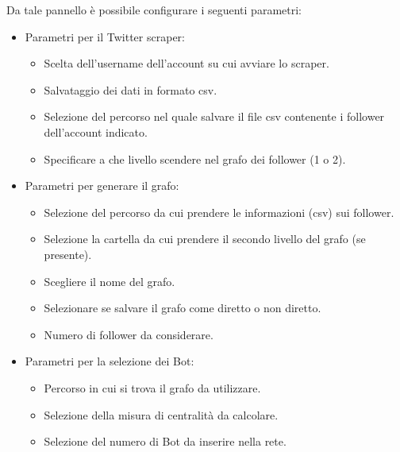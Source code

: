           Da tale pannello è possibile configurare i seguenti parametri:
          \begin{itemize}
          
            \item Parametri per il Twitter scraper:
              \begin{itemize}
                \item Scelta dell'username dell'account su cui avviare lo scraper.
                \item Salvataggio dei dati in formato csv.
                \item Selezione del percorso nel quale salvare il file csv contenente i follower dell'account indicato.
                \item Specificare a che livello scendere nel grafo dei follower (1 o 2).
              \end{itemize}
              
            \item Parametri per generare il grafo:
              \begin{itemize}
                \item Selezione del percorso da cui prendere le informazioni (csv) sui follower.
                \item Selezione la cartella da cui prendere il secondo livello del grafo (se presente).
                \item Scegliere il nome del grafo.
                \item Selezionare se salvare il grafo come diretto o non diretto.
                \item Numero di follower da considerare.
              \end{itemize}
              
            \item Parametri per la selezione dei Bot:
              \begin{itemize}
                \item Percorso in cui si trova il grafo  da utilizzare.
                \item Selezione della misura di centralità da calcolare.
                \item Selezione del numero di Bot da inserire nella rete.
              \end{itemize}
              

\end{itemize}
